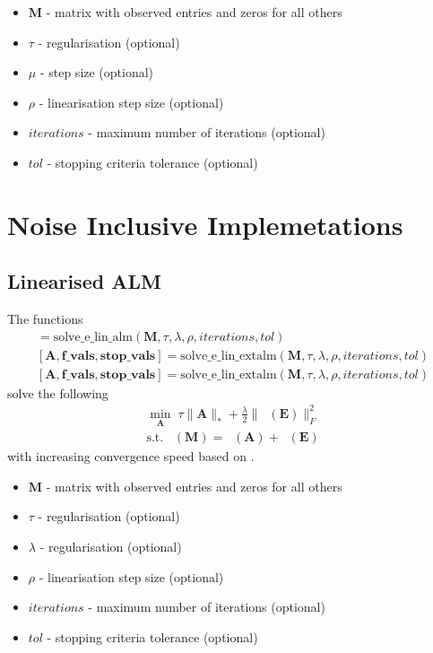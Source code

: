 \documentclass{article}
\DeclareMathOperator*{\pro}{\mathcal P_{\Omega}}
\begin{document}
\begin{itemize}
\item $\mathbf M$ - matrix with observed entries and zeros for all others
\item $\tau$ - regularisation (optional)
\item $\mu$ - step size (optional)
\item $\rho$ - linearisation step size (optional)
\item $iterations$ - maximum number of iterations (optional)
\item $tol$ - stopping criteria tolerance (optional)
\end{itemize}

\newpage
\section{Noise Inclusive Implemetations}

\subsection{Linearised ALM}

The functions
\begin{align}
[ \mathbf A, \mathbf{f\_vals}, \mathbf{stop\_vals} ] = \text{solve\_e\_lin\_alm}( \mathbf M, \tau, \lambda, \rho, iterations, tol ) \\
[ \mathbf A, \mathbf{f\_vals}, \mathbf{stop\_vals} ] = \text{solve\_e\_lin\_extalm}( \mathbf M, \tau, \lambda, \rho, iterations, tol ) \\
[ \mathbf A, \mathbf{f\_vals}, \mathbf{stop\_vals} ] = \text{solve\_e\_lin\_extalm}( \mathbf M, \tau, \lambda, \rho, iterations, tol )
\end{align}
solve the following
\begin{align}
\min_{\mathbf A} \; \tau \| \mathbf A \|_* + \frac{\lambda}{2} \| \pro (\mathbf E) \|_F^2\\
\text{s.t.} \; \pro (\mathbf M) = \pro (\mathbf A) + \pro (\mathbf E) \nonumber 
\end{align}
with increasing convergence speed based on \cite{ji2009accelerated}.

\begin{itemize}
\item $\mathbf M$ - matrix with observed entries and zeros for all others
\item $\tau$ - regularisation (optional)
\item $\lambda$ - regularisation (optional)
\item $\rho$ - linearisation step size (optional)
\item $iterations$ - maximum number of iterations (optional)
\item $tol$ - stopping criteria tolerance (optional)
\end{itemize}

\newpage


\end{document}
